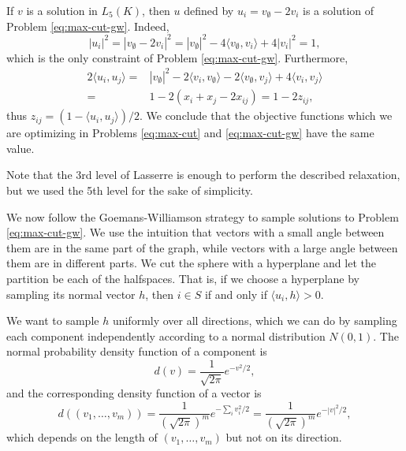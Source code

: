 \documentclass[a4paper,twoside,justified]{tufte-handout}
\begin{document}
If $v$ is a solution in $L_5(K)$, then $u$ defined by $u_i = v_\emptyset - 2v_i$ is a solution of  Problem \eqref{eq:max-cut-gw}. Indeed, 
\[|u_i|^2 = |v_\emptyset - 2v_i|^2 = |v_\emptyset|^2 -4\langle v_\emptyset,v_i\rangle + 4|v_i|^2 =1,\]
 which is the only constraint of Problem \eqref{eq:max-cut-gw}. Furthermore, 
\begin{alignat*}{2}
\langle u_i,u_j\rangle =& |v_\emptyset|^2 -2 \langle v_i,v_\emptyset\rangle -2\langle v_\emptyset,v_j\rangle +4\langle v_i,v_j\rangle \\
 =&1 - 2(x_i+x_j-2x_{ij}) = 1-2z_{ij},
\end{alignat*}
thus $z_{ij} = (1-\langle u_i,u_j \rangle)/2$. We conclude that the objective functions which we are optimizing in Problems \eqref{eq:max-cut} and \eqref{eq:max-cut-gw} have the same value.

Note that the 3rd level of Lasserre is enough\cite{lasserresurvey2013} to perform the described relaxation, but we used the 5th level for the sake of simplicity.

We now follow the Goemans-Williamson strategy to sample solutions to Problem \eqref{eq:max-cut-gw}. We use the intuition that vectors with a small angle between them are in the same part of the graph, while vectors with a large angle between them are in different parts. We cut the sphere with a hyperplane and let the partition be each of the halfspaces. That is, if we choose a hyperplane by sampling its normal vector $h$, then $i \in S$ if and only if $\langle u_i,h \rangle > 0$.

We want to sample $h$ uniformly over all directions, which we can do by sampling each component independently according to a normal distribution $N(0,1)$. The normal probability density function of a component is 
\[d(v)= \frac{1}{\sqrt {2\pi}}e^{-v^2/2},\] 
and the corresponding density function of a vector is 
\[d((v_1,\ldots,v_m)) = \frac{1}{(\sqrt {2\pi})^m}e^{-\sum_i v_i^2/2} = \frac{1}{(\sqrt {2\pi})^m}e^{-|v|^2/2},\]
which depends on the length of $(v_1,\ldots,v_m)$ but not on its direction.
\end{document}
